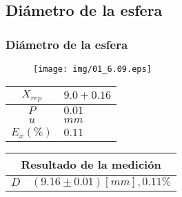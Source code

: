 \documentclass[letter,11pt]{beamer}
\begin{document}
\subsection{Diámetro de la esfera}
\begin{frame}
\frametitle{Diámetro de la esfera}
\vspace*{0.8cm}
\begin{figure}
\centering
\texttt{[image: img/01\_6.09.eps]}
\end{figure}
\vspace*{0.4cm}
\scriptsize
\begin{tabular}{|c|>{\centering}m{1.8cm}<{\centering}|}
\hline
$X_{rep}$ &  $9.0+0.16$ \tabularnewline \hline
      $P$ &      $0.01$ \tabularnewline \hline
      $u$ &        $mm$ \tabularnewline \hline
$E_x(\%)$ &      $0.11$ \tabularnewline \hline
\end{tabular}
\quad
\begin{tabular}{|c|>{\centering}m{5.7cm}<{\centering}|}
\hline
\multicolumn{2}{|c|}{\textbf{Resultado de la medición}} \\ \hline
$D$ & $( 9.16\pm0.01)[mm], 0.11\%$ \tabularnewline \hline
\end{tabular}
\end{frame}
\end{document}
